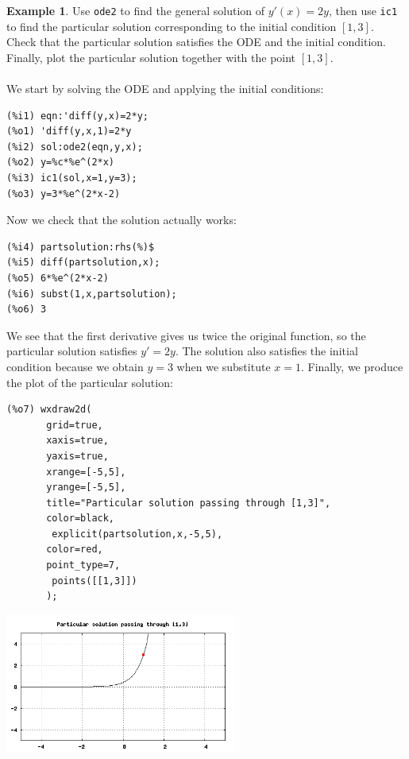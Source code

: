 \documentclass[10.5pt,twoside]{report}
\theoremstyle{definition}
\newtheorem{exmp}{Example}[section]
\begin{document}
\begin{exmp} Use \verb|ode2| to find the general solution of $y'(x)=2y$, then use \verb|ic1| to find the particular solution corresponding to the initial condition $[1,3]$. Check that the particular solution satisfies the ODE and the initial condition.  Finally, plot the particular solution together with the point $[1,3]$.\\
${}$\\
We start by solving the ODE and applying the initial conditions:

\begin{verbatim}
(%i1) eqn:'diff(y,x)=2*y;
(%o1) 'diff(y,x,1)=2*y
(%i2) sol:ode2(eqn,y,x);
(%o2) y=%c*%e^(2*x)
(%i3) ic1(sol,x=1,y=3);
(%o3) y=3*%e^(2*x-2)
\end{verbatim}

Now we check that the solution actually works:

\begin{verbatim}
(%i4) partsolution:rhs(%)$
(%i5) diff(partsolution,x);
(%o5) 6*%e^(2*x-2)
(%i6) subst(1,x,partsolution);
(%o6) 3
\end{verbatim}

We see that the first derivative gives us twice the original function, so the particular solution satisfies $y'=2y$.  The solution also satisfies the initial condition because we obtain $y=3$ when we substitute $x=1$.  Finally, we produce the plot of the particular solution:

\begin{verbatim}
(%o7) wxdraw2d(
       grid=true,
       xaxis=true,
       yaxis=true,
       xrange=[-5,5],
       yrange=[-5,5],
       title="Particular solution passing through [1,3]",
       color=black,
        explicit(partsolution,x,-5,5),
       color=red,
       point_type=7,
        points([[1,3]])
       );
\end{verbatim}


\includegraphics[width=3in]{example_4_3_1_1}

\end{exmp}
\end{document}

